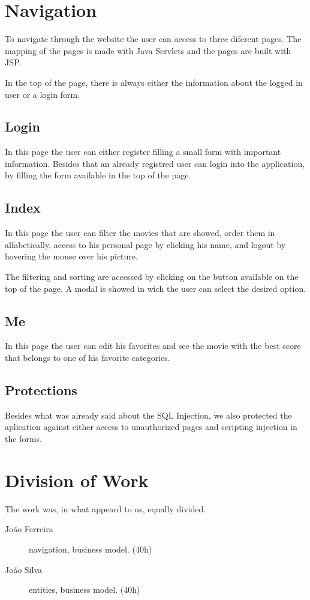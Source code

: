 \documentclass[12pt]{article}
\begin{document}
\clearpage

\section{Navigation}
\indent \indent To navigate through the website the user can access to three diferent pages. The mapping of the pages is made with Java Servlets and the pages are built with JSP.

In the top of the page, there is always either the information about the logged in user or a login form.

\subsection{Login}
\indent \indent In this page the user can either register filling a small form with important information.
Besides that an already registred user can login into the application, by filling the form available in the top of the page.

\subsection{Index}
\indent \indent In this page the user can filter the movies that are showed, order them in alfabetically, access to his personal page by clicking his name, and logout by hovering the mouse over his picture.

The filtering and sorting are accessed by clicking on the button available on the top of the page. A modal is showed in wich the user can select the desired option.

\subsection{Me}
\indent \indent In this page the user can edit his favorites and see the movie with the best score that belongs to one of his favorite categories.

\subsection{Protections}
\indent \indent Besides what was already said about the SQL Injection, we also protected the aplication against either access to unauthorized pages and scripting injection in the forms.
\clearpage

\section{Division of Work}
\indent \indent The work was, in what appeard to us, equally divided.
\begin{description}
	\item [João Ferreira] navigation, business model. (40h)
	\item [João Silva] entities, business model. (40h)
\end{description}
\clearpage
\end{document}

